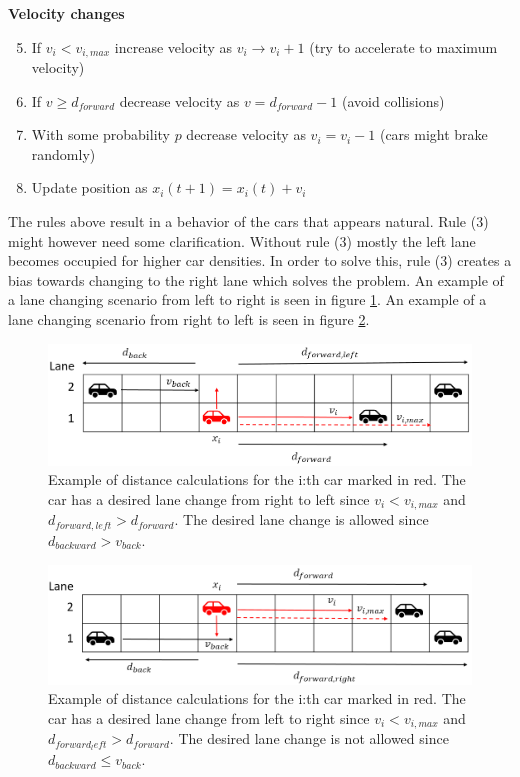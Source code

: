 \documentclass[a4paper,12pt]{article}
\begin{document}
\textbf{Velocity changes}
\begin{enumerate}
    \setcounter{enumi}{4}
    \item If $v_i<v_{i, max}$ increase velocity as $v_i \rightarrow v_i+1$ (try to accelerate to maximum velocity)
    \item If $v \geq d_{forward}$ decrease velocity as $v = d_{forward} - 1$ (avoid collisions)
    \item With some probability $p$ decrease velocity as $v_i=v_i-1$ (cars might brake randomly)
    \item Update position as $x_i(t+1) = x_i(t) + v_i$
\end{enumerate}

The rules above result in a behavior of the cars that appears natural. Rule (3) might however need some
clarification. Without rule (3) mostly the left lane becomes occupied for higher car densities. In order to solve this, rule (3) creates
a bias towards changing to the right lane which solves the problem. An example of a lane changing scenario from left to right is seen in figure
\ref*{left turn}. An example of a lane changing scenario from right to left is seen in figure \ref*{right turn}.

\begin{figure}[H]
    \centering
    \includegraphics[scale=0.6]{Images/left turn.png}
    \caption{Example of distance calculations for the i:th car marked in red. The car has a desired
    lane change from right to left since $v_i < v_{i, max}$ and $d_{forward,left}>d_{forward}$. The desired lane change
    is allowed since $d_{backward} > v_{back}$.}
    \label{left turn}
\end{figure}

\begin{figure}[H]
    \centering
    \includegraphics[scale=0.6]{Images/right turn.png}
    \caption{Example of distance calculations for the i:th car marked in red. The car has a desired
    lane change from left to right since $v_i < v_{i, max}$ and $d_{forward_left}>d_{forward}$. The desired lane change
    is not allowed since $d_{backward} \leq v_{back}$.}
    \label{right turn}
\end{figure}
\end{document}
